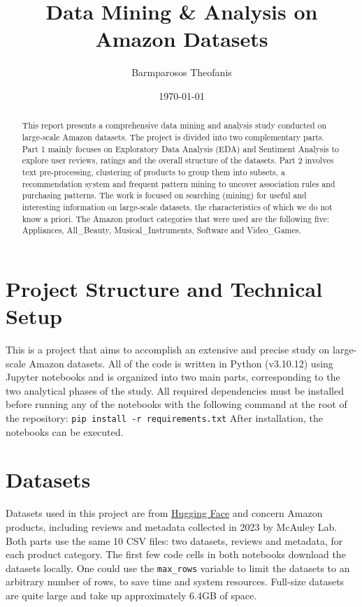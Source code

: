 \documentclass[a4paper, 12pt]{article}
\title{\textbf{Data Mining \& Analysis on Amazon Datasets}}
\author{Barmparosos Theofanis}
\date{\today}
\begin{document}
\maketitle

\begin{abstract}
This report presents a comprehensive data mining and analysis study conducted on large-scale Amazon datasets. The project is divided into two complementary parts. Part 1 mainly focuses on Exploratory Data Analysis (EDA) and Sentiment Analysis to explore user reviews, ratings and the overall structure of the datasets. Part 2 involves text pre-processing, clustering of products to group them into subsets, a recommendation system and frequent pattern mining to uncover association rules and purchasing patterns. The work is focused on searching (mining) for useful and interesting information on large-scale datasets, the characteristics of which we do not know a priori. The Amazon product categories that were used are the following five: Appliances, All\_Beauty, Musical\_Instruments, Software and Video\_Games.
\end{abstract}


{\small \tableofcontents}
\newpage

\section{Project Structure and Technical Setup}

This is a project that aims to accomplish an extensive and precise study on large-scale Amazon datasets. All of the code is written in Python (v3.10.12) using Jupyter notebooks and is organized into two main parts, corresponding to the two analytical phases of the study. All required dependencies must be installed before running any of the notebooks with the following command at the root of the repository:
\colorbox{backcolour}{\texttt{pip install -r requirements.txt}}
After installation, the notebooks can be executed.

\section{Datasets}
Datasets used in this project are from \href{https://huggingface.co/datasets}{Hugging Face} and concern Amazon products, including reviews and metadata collected in 2023 by McAuley Lab. Both parts use the same 10 CSV files: two datasets, reviews and metadata, for each product category. The first few code cells in both notebooks download the datasets locally. One could use the \texttt{max\_rows} variable to limit the datasets to an arbitrary number of rows, to save time and system resources. Full-size datasets are quite large and take up approximately 6.4GB of space.
\end{document}
